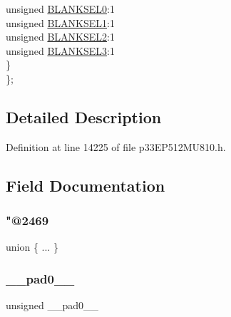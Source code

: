 \begin{DoxyCompactItemize}
\begin{tabbing}
\>\>unsigned \hyperlink{structtag_a_u_x_c_o_n1_b_i_t_s_ac11d96c4da7a19f8070237598aad5779}{BLANKSEL0}:1\\
\>\>unsigned \hyperlink{structtag_a_u_x_c_o_n1_b_i_t_s_a44677be7697055968c0df4a017937ad4}{BLANKSEL1}:1\\
\>\>unsigned \hyperlink{structtag_a_u_x_c_o_n1_b_i_t_s_aded93be63f6e5d719aa8cd84f125f650}{BLANKSEL2}:1\\
\>\>unsigned \hyperlink{structtag_a_u_x_c_o_n1_b_i_t_s_a9a435fdd957a6f0e1b6e67ea964df687}{BLANKSEL3}:1\\
\>\} \\
\}; \\

\end{tabbing}\end{DoxyCompactItemize}


\subsection{Detailed Description}


Definition at line 14225 of file p33\+E\+P512\+M\+U810.\+h.



\subsection{Field Documentation}
\mbox{\label{structtag_a_u_x_c_o_n1_b_i_t_s_a1b1fa6835bd6acb4d4b0c2776f07c867}} 
\subsubsection{\texorpdfstring{"@2469}{@2469}}
{\footnotesize\ttfamily union \{ ... \} }

\mbox{\label{structtag_a_u_x_c_o_n1_b_i_t_s_adf71f3d8410c1f1dbbc96680a92c49af}} 
\subsubsection{\texorpdfstring{\+\_\+\+\_\+pad0\+\_\+\+\_\+}{\_\_pad0\_\_}}
{\footnotesize\ttfamily unsigned \+\_\+\+\_\+pad0\+\_\+\+\_\+}



